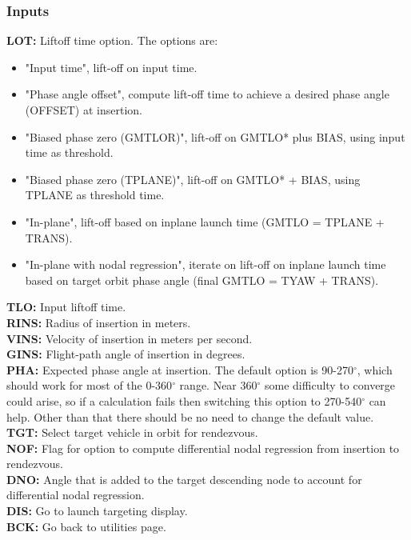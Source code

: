 \documentclass[11pt]{article} %
\begin{document}
\subsubsection{Inputs}

\textbf{LOT:} Liftoff time option. The options are: 

\begin{itemize}
\item{"Input time", lift-off on input time.}
\item{"Phase angle offset", compute lift-off time to achieve a desired phase angle (OFFSET) at insertion.}
\item{"Biased phase zero (GMTLOR)", lift-off on GMTLO* plus BIAS, using input time as threshold.}
\item{"Biased phase zero (TPLANE)", lift-off on GMTLO* + BIAS, using TPLANE as threshold time.}
\item{"In-plane", lift-off based on inplane launch time (GMTLO = TPLANE + TRANS).}
\item{"In-plane with nodal regression", iterate on lift-off on inplane launch time based on target orbit phase angle (final GMTLO = TYAW + TRANS).}
\end{itemize}

\textbf{TLO:} Input liftoff time.\\
\textbf{RINS:} Radius of insertion in meters.\\
\textbf{VINS:} Velocity of insertion in meters per second.\\
\textbf{GINS:} Flight-path angle of insertion in degrees.\\
\textbf{PHA:} Expected phase angle at insertion. The default option is 90-270$^{\circ}$, which should work for most of the 0-360$^{\circ}$ range. Near 360$^{\circ}$ some difficulty to converge could arise, so if a calculation fails then switching this option to 270-540$^{\circ}$ can help. Other than that there should be no need to change the default value.\\

\textbf{TGT:} Select target vehicle in orbit for rendezvous.\\
\textbf{NOF:} Flag for option to compute differential nodal regression from insertion to rendezvous.\\
\textbf{DNO:} Angle that is added to the target descending node to account for differential nodal regression.\\
\textbf{DIS:} Go to launch targeting display.\\ 
\textbf{BCK:} Go back to utilities page.\\
\end{document}
